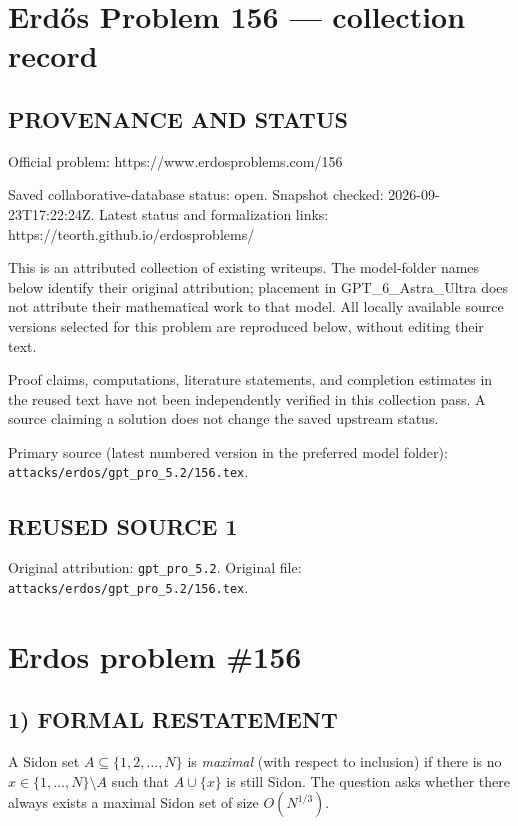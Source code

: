 \section*{Erd\H{o}s Problem 156 --- collection record}

\subsection*{PROVENANCE AND STATUS}
Official problem: https://www.erdosproblems.com/156

Saved collaborative-database status: open.
Snapshot checked: 2026-09-23T17:22:24Z.
Latest status and formalization links: https://teorth.github.io/erdosproblems/

This is an attributed collection of existing writeups. The model-folder names below identify their original attribution; placement in GPT\_6\_Astra\_Ultra does not attribute their mathematical work to that model. All locally available source versions selected for this problem are reproduced below, without editing their text.

Proof claims, computations, literature statements, and completion estimates in the reused text have not been independently verified in this collection pass. A source claiming a solution does not change the saved upstream status.

Primary source (latest numbered version in the preferred model folder): \texttt{attacks/erdos/gpt\_pro\_5.2/156.tex}.

\subsection*{REUSED SOURCE 1}
Original attribution: \texttt{gpt\_pro\_5.2}.
Original file: \texttt{attacks/erdos/gpt\_pro\_5.2/156.tex}.

\section*{Erdos problem \#156}

\subsection*{1) FORMAL RESTATEMENT}
A Sidon set $A\subseteq\{1,2,\dots,N\}$ is \emph{maximal} (with respect to inclusion) if there is no $x\in\{1,\dots,N\}\setminus A$ such that $A\cup\{x\}$ is still Sidon.
The question asks whether there always exists a maximal Sidon set of size $O(N^{1/3})$.

